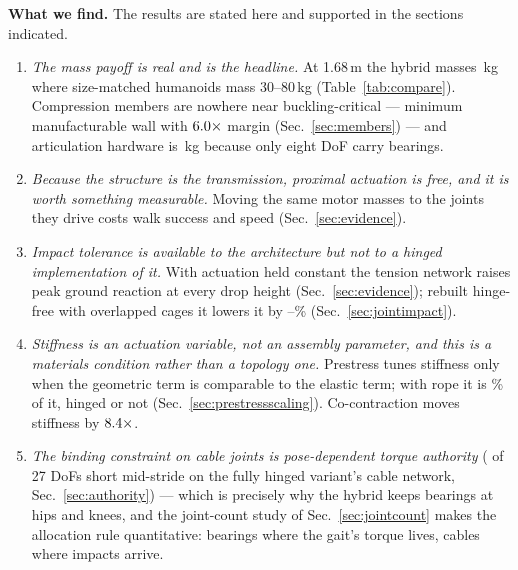\documentclass[conference]{IEEEtran}
\begin{document}
\textbf{What we find.} The results are stated here and supported in the
sections indicated.
\begin{enumerate}
  \item \emph{The mass payoff is real and is the headline.} At 1.68\,m the
    hybrid masses \hybridMass\,kg where size-matched humanoids mass
    30--80\,kg (Table~\ref{tab:compare}). Compression members are nowhere
    near buckling-critical --- minimum manufacturable wall with
    $6.0\times$ margin (Sec.~\ref{sec:members}) --- and
    articulation hardware is \hybridJointHw\,kg because only eight DoF carry
    bearings.
  \item \emph{Because the structure is the transmission, proximal actuation
    is free, and it is worth something measurable.} Moving the same motor
    masses to the joints they drive costs walk success and speed
    (Sec.~\ref{sec:evidence}).
  \item \emph{Impact tolerance is available to the architecture but not to a
    hinged implementation of it.} With actuation held constant the tension
    network raises peak ground reaction at every drop height
    (Sec.~\ref{sec:evidence}); rebuilt hinge-free with overlapped cages it
    lowers it by \jointImpactLo--\jointImpactHi\%
    (Sec.~\ref{sec:jointimpact}).
  \item \emph{Stiffness is an actuation variable, not an assembly parameter,
    and this is a materials condition rather than a topology one.} Prestress
    tunes stiffness only when the geometric term is comparable to the elastic
    term; with rope it is \jointGeomElasticRope\% of it, hinged or not
    (Sec.~\ref{sec:prestressscaling}). Co-contraction moves stiffness by
    $8.4\times$.
  \item \emph{The binding constraint on cable joints is pose-dependent
    torque authority} (\authShortGaitBom{} of 27 DoFs short mid-stride on the
    fully hinged variant's cable network, Sec.~\ref{sec:authority}) --- which
    is precisely why the hybrid keeps bearings at hips and knees, and the
    joint-count study of Sec.~\ref{sec:jointcount} makes the allocation rule
    quantitative: bearings where the gait's torque lives, cables where
    impacts arrive.
\end{enumerate}
\end{document}
